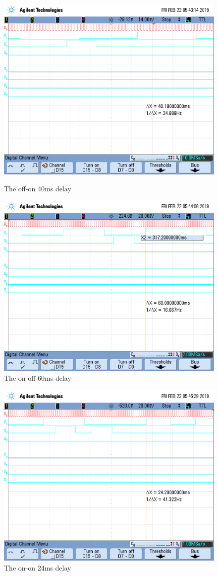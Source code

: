 \documentclass[a4paper, 12pt]{article}
\begin{document}
\begin{figure}[htp]
\centering
\includegraphics[width=.8\textwidth]{01.png}
\caption{The off-on 40ms delay}
\includegraphics[width=.8\textwidth]{10.png}
\caption{The on-off 60ms delay}
\end{figure}

\begin{figure}[htb]
\centering
\includegraphics[width=.8\textwidth]{11.png}
\caption{The on-on 24ms delay}
\end{figure}
\end{document}
